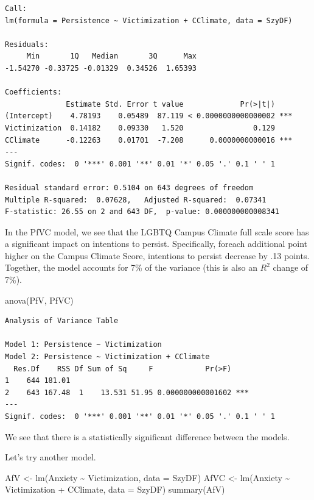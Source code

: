 \documentclass[
  english,
]{book}
\newenvironment{Shaded}{\begin{snugshade}}{\end{snugshade}}
\newcommand{\AttributeTok}[1]{\textcolor[rgb]{0.77,0.63,0.00}{#1}}
\newcommand{\FunctionTok}[1]{\textcolor[rgb]{0.00,0.00,0.00}{#1}}
\newcommand{\NormalTok}[1]{#1}
\newcommand{\OtherTok}[1]{\textcolor[rgb]{0.56,0.35,0.01}{#1}}
\newcommand{\SpecialCharTok}[1]{\textcolor[rgb]{0.00,0.00,0.00}{#1}}
\begin{document}
\begin{verbatim}
Call:
lm(formula = Persistence ~ Victimization + CClimate, data = SzyDF)

Residuals:
     Min       1Q   Median       3Q      Max 
-1.54270 -0.33725 -0.01329  0.34526  1.65393 

Coefficients:
              Estimate Std. Error t value             Pr(>|t|)    
(Intercept)    4.78193    0.05489  87.119 < 0.0000000000000002 ***
Victimization  0.14182    0.09330   1.520                0.129    
CClimate      -0.12263    0.01701  -7.208      0.0000000000016 ***
---
Signif. codes:  0 '***' 0.001 '**' 0.01 '*' 0.05 '.' 0.1 ' ' 1

Residual standard error: 0.5104 on 643 degrees of freedom
Multiple R-squared:  0.07628,   Adjusted R-squared:  0.07341 
F-statistic: 26.55 on 2 and 643 DF,  p-value: 0.000000000008341
\end{verbatim}

In the PfVC model, we see that the LGBTQ Campus Climate full scale score has a significant impact on intentions to persist. Specifically, foreach additional point higher on the Campus Climate Score, intentions to persist decrease by .13 points. Together, the model accounts for 7\% of the variance (this is also an \(R^2\) change of 7\%).

\begin{Shaded}
\begin{Highlighting}[]
\FunctionTok{anova}\NormalTok{(PfV, PfVC)}
\end{Highlighting}
\end{Shaded}

\begin{verbatim}
Analysis of Variance Table

Model 1: Persistence ~ Victimization
Model 2: Persistence ~ Victimization + CClimate
  Res.Df    RSS Df Sum of Sq     F            Pr(>F)    
1    644 181.01                                         
2    643 167.48  1    13.531 51.95 0.000000000001602 ***
---
Signif. codes:  0 '***' 0.001 '**' 0.01 '*' 0.05 '.' 0.1 ' ' 1
\end{verbatim}

We see that there is a statistically significant difference between the models.

Let's try another model.

\begin{Shaded}
\begin{Highlighting}[]
\NormalTok{AfV }\OtherTok{\textless{}{-}} \FunctionTok{lm}\NormalTok{(Anxiety }\SpecialCharTok{\textasciitilde{}}\NormalTok{ Victimization, }\AttributeTok{data =}\NormalTok{ SzyDF)}
\NormalTok{AfVC }\OtherTok{\textless{}{-}} \FunctionTok{lm}\NormalTok{(Anxiety }\SpecialCharTok{\textasciitilde{}}\NormalTok{ Victimization }\SpecialCharTok{+}\NormalTok{ CClimate, }\AttributeTok{data =}\NormalTok{ SzyDF)}
\FunctionTok{summary}\NormalTok{(AfV)}
\end{Highlighting}
\end{Shaded}
\end{document}
